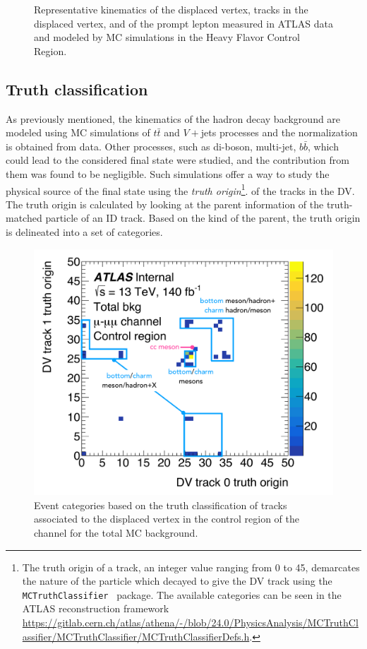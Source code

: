 \begin{figure}[!ht]
    \caption{Representative kinematics of the displaced vertex, tracks in the displaced vertex, and of the prompt lepton measured in ATLAS data and modeled by MC simulations in the \eee Heavy Flavor Control Region.}
    \label{fig:cr_plots_eee}
\end{figure}

\FloatBarrier
\subsection{Truth classification}
As previously mentioned, the kinematics of the hadron decay background are modeled using MC simulations of $t\bar{t}$ and $V+$jets processes and the normalization is obtained from data. Other processes, such as di-boson, multi-jet, $b\bar{b}$, which could lead to the considered final state were studied, and the contribution from them was found to be negligible. Such simulations offer a way to study the physical source of the final state using the \textit{truth origin}\footnote{The truth origin of a track, an integer value ranging from 0 to 45, demarcates the nature of the particle which decayed to give the DV track using the \texttt{MCTruthClassifier}~\cite{mc-truth-web} package. The available categories can be seen in the ATLAS reconstruction framework \url{https://gitlab.cern.ch/atlas/athena/-/blob/24.0/PhysicsAnalysis/MCTruthClassifier/MCTruthClassifier/MCTruthClassifierDefs.h}.}. 
of the tracks in the DV. The truth origin is calculated by looking at the parent information of the truth-matched particle of an ID track. Based on the kind of the parent, the truth origin is delineated into a set of categories.

\begin{figure}[!ht]
    \centering
    \includegraphics[width=0.66\linewidth]{figures/analysis_strategy/mc_classifier_studies/truth_classification_example.pdf}
    \caption{Event categories based on the truth classification of tracks associated to the displaced vertex in the control region of the \uuu channel for the total MC background.}
    \label{fig:mctruth_groups}
\end{figure}

